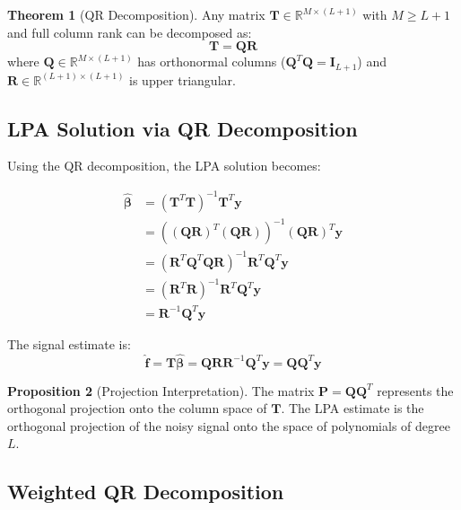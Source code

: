 \documentclass[12pt]{article}
\renewcommand{\vec}[1]{\mathbf{#1}}
\newcommand{\mat}[1]{\mathbf{#1}}
\newcommand{\R}{\mathbb{R}}
\theoremstyle{definition}
\newtheorem{theorem}{Theorem}[section]
\newtheorem{proposition}[theorem]{Proposition}
\begin{document}
\begin{theorem}[QR Decomposition]
    \label{thm:qr_decomp}
    Any matrix $\mat{T} \in \R^{M \times (L+1)}$ with $M \geq L+1$ and full column rank can be decomposed as:
    \begin{equation}
        \label{eq:qr_decomp}
        \mat{T} = \mat{Q}\mat{R}
    \end{equation}
    where $\mat{Q} \in \R^{M \times (L+1)}$ has orthonormal columns ($\mat{Q}^T\mat{Q} = \mat{I}_{L+1}$) and $\mat{R} \in \R^{(L+1) \times (L+1)}$ is upper triangular.
\end{theorem}

\subsection{LPA Solution via QR Decomposition}
\label{subsec:lpa_qr_solution}

Using the QR decomposition, the LPA solution becomes:

\begin{align}
    \hat{\vec{\beta}} & = (\mat{T}^T\mat{T})^{-1}\mat{T}^T\vec{y}                            \\
                      & = ((\mat{Q}\mat{R})^T(\mat{Q}\mat{R}))^{-1}(\mat{Q}\mat{R})^T\vec{y} \\
                      & = (\mat{R}^T\mat{Q}^T\mat{Q}\mat{R})^{-1}\mat{R}^T\mat{Q}^T\vec{y}   \\
                      & = (\mat{R}^T\mat{R})^{-1}\mat{R}^T\mat{Q}^T\vec{y}                   \\
                      & = \mat{R}^{-1}\mat{Q}^T\vec{y}
\end{align}

The signal estimate is:
\begin{equation}
    \label{eq:signal_estimate_qr}
    \hat{\vec{f}} = \mat{T}\hat{\vec{\beta}} = \mat{Q}\mat{R}\mat{R}^{-1}\mat{Q}^T\vec{y} = \mat{Q}\mat{Q}^T\vec{y}
\end{equation}

\begin{proposition}[Projection Interpretation]
    \label{prop:projection}
    The matrix $\mat{P} = \mat{Q}\mat{Q}^T$ represents the orthogonal projection onto the column space of $\mat{T}$. The LPA estimate is the orthogonal projection of the noisy signal onto the space of polynomials of degree $L$.
\end{proposition}

\subsection{Weighted QR Decomposition}
\label{subsec:weighted_qr}
\end{document}
